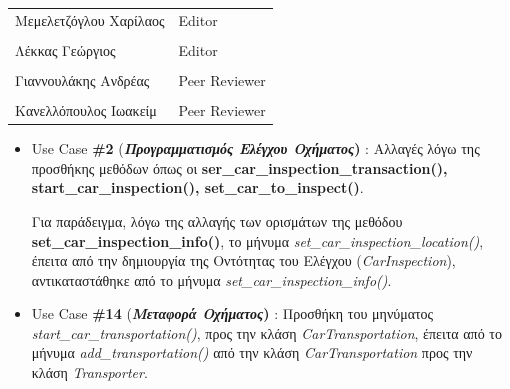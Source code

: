 \documentclass{../ol-softwaremanual}
\begin{document}
	
	\vspace{20pt}
	
	\begin{table}[htbp!]
		\begin{tabular}{ll}
			Μεμελετζόγλου Χαρίλαος & \en Editor \\
			\\ Λέκκας Γεώργιος      &   \en  Editor \\
			\\ Γιαννουλάκης Ανδρέας & \en Peer Reviewer \\
			\\ Κανελλόπουλος Ιωακείμ & \en Peer Reviewer \\ 
		\end{tabular}
	\end{table}
	
	
	\vspace{20pt}
	
	
	\vspace{10pt}
	\flushleft
	
	\begin{itemize}			
		\item \en Use Case  \textbf{\#2} (\gr \textbf{\textit{Προγραμματισμός Ελέγχου Οχήματος}) }: Αλλαγές λόγω της προσθήκης μεθόδων όπως οι \en \textbf{ser\_car\_inspection\_transaction(), start\_car\_inspection(), set\_car\_to\_inspect()}\gr.
		
		Για παράδειγμα, λόγω της αλλαγής των ορισμάτων της μεθόδου \en\textbf{set\_car\_inspection\_info()}\gr, το μήνυμα \en\textit{set\_car\_inspection\_location()}\gr,  έπειτα από την δημιουργία της Οντότητας του Ελέγχου (\en \textit{CarInspection}\gr), αντικαταστάθηκε από το μήνυμα \en \textit{set\_car\_inspection\_info()}\gr.
		
		
		\item \en Use Case  \textbf{\#14} (\gr \textbf{\textit{Μεταφορά Οχήματος}) }: Προσθήκη του μηνύματος \en \textit{start\_car\_transportation()}\gr, προς την κλάση \en \textit{CarTransportation}\gr, έπειτα από το μήνυμα \en \textit{add\_transportation()} \gr από την κλάση \en \textit{CarTransportation} \gr προς την κλάση \en \textit{Transporter}\gr.

		
	\end{itemize}	
	

	
	\newpage
	
	
\end{document}
